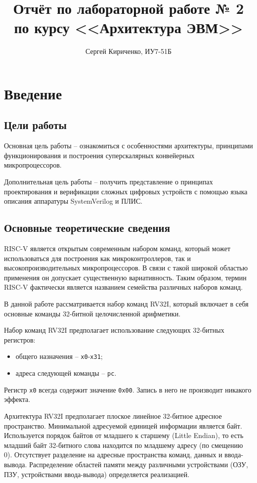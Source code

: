 \documentclass[oneside, a4paper, 12pt]{report}
\title{
    Отчёт по лабораторной работе № 2 по курсу <<Архитектура ЭВМ>>
}
\author{Сергей Кириченко, ИУ7-51Б}
\begin{document}
\maketitle
\tableofcontents

\chapter{Введение}

\section{Цели работы}

Основная цель работы -- ознакомиться с особенностями архитектуры,
принципами функционирования и построения суперскалярных конвейерных
микропроцессоров.

Дополнительная цель работы -- получить представление о принципах
проектирования и верификации сложных цифровых устройств с помощью
языка описания аппаратуры SystemVerilog и ПЛИС.

\section{Основные теоретические сведения}

RISC-V является открытым современным набором команд, который может
использоваться для построения как микроконтроллеров, так и
высокопроизводительных микропроцессоров. В связи с такой широкой
областью применения он допускает существенную вариативность. Таким
образом, термин RISC-V фактически является названием семейства
различных наборов команд.

В данной работе рассматривается набор команд RV32I, который
включает в себя основные команды 32-битной целочисленной
арифметики.

Набор команд RV32I предполагает использование следующих 32-битных
регистров:

\begin{itemize}
    \item общего назначения -- \texttt{x0}-\texttt{x31};
    \item адреса следующей команды -- \texttt{pc}.
\end{itemize}

Регистр \texttt{x0} всегда содержит значение \texttt{0x00}. Запись
в него не производит никакого эффекта.

Архитектура RV32I предполагает плоское линейное 32-битное адресное
пространство. Минимальной адресуемой единицей информации является
байт. Используется порядок байтов от младшего к старшему (Little
Endian), то есть младший байт 32-битного слова находится по
младшему адресу (по смещению 0). Отсутствует разделение на адресные
пространства команд, данных и ввода-вывода. Распределение областей
памяти между различными устройствами (ОЗУ, ПЗУ, устройствами
ввода-вывода) определяется реализацией.
\end{document}
